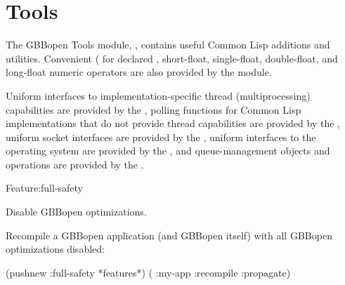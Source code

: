 \documentclass[10pt,twoside,english,pdftex]{article}
\begin{document}

\T\markright{}%
\T\pagestyle{plain}
\T\cleardoublepage
\W{}
\T\pagestyle{fancy}
\T\thispagestyle{fancybottom}
\T\global\def\fnlastname{ }%
\T\renewcommand{\headrulewidth}{0pt}
\section{Tools}

%
%
The GBBopen Tools module, , contains useful Common Lisp
additions and utilities.  Convenient ( for declared , short-float,
single-float, double-float, and long-float numeric operators are also provided
by the  module.

Uniform interfaces to implementation-specific thread (multiprocessing)
capabilities are provided by the , polling functions for Common Lisp
implementations that do not provide thread capabilities are
provided by the , uniform socket interfaces are
provided by the , uniform interfaces to the operating
system are provided by the , and queue-management objects and
operations are provided by the .

\W\entities
\T\clearpage
\T\renewcommand{\headrulewidth}{0.01pt}


\begin{functiondoc}{Feature}{:full-safety}{}%
%
%
%

\fnsyntax

\fnpurpose Disable GBBopen optimizations.

\fnexample
{}%
%
%
Recompile a GBBopen application (and GBBopen itself) with all GBBopen
optimizations disabled:
\begin{example}
  (pushnew :full-safety *features*)
  ( :my-app :recompile :propagate)
\end{example}

\end{functiondoc}
\end{document}
